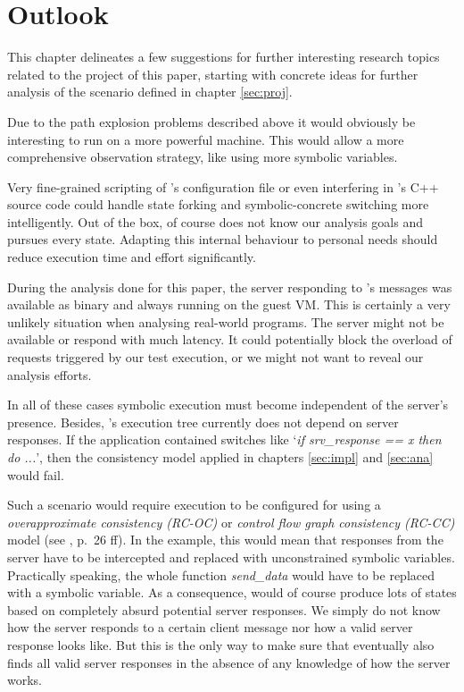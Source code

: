 \section{Outlook}\label{sec:outlook}

This chapter delineates a few suggestions for further interesting research topics related to the project of this paper, starting with concrete ideas for further analysis of the scenario defined in chapter \ref{sec:proj}.

\medskip
Due to the path explosion problems described above it would obviously be interesting to run \sse on a more powerful machine.
This would allow a more comprehensive observation strategy, like using more symbolic variables.

\medskip
Very fine-grained scripting of \sse's configuration file or even interfering in \sse's C++ source code could handle state forking and symbolic-concrete switching more intelligently.
Out of the box, \sse of course does not know our analysis goals and pursues every state.
Adapting this internal behaviour to personal needs should reduce execution time and effort significantly.

\medskip
During the analysis done for this paper, the server responding to \app's messages was available as binary and always running on the guest VM.
This is certainly a very unlikely situation when analysing real-world programs.
The server might not be available or respond with much latency.
It could potentially block the overload of requests triggered by our test execution, or we might not want to reveal our analysis efforts.

In all of these cases symbolic execution must become independent of the server's presence.
Besides, \app's execution tree currently does not depend on server responses.
If the application contained switches like `\textit{if srv\_response == x then do ...}', then the consistency model applied in chapters \ref{sec:impl} and \ref{sec:ana} would fail.

Such a scenario would require \sse execution to be configured for using a \textit{overapproximate consistency (RC-OC)} or \textit{control flow graph consistency (RC-CC)} model (see \cite{chip14s2e}, p.~26 ff).
In the \app example, this would mean that responses from the server have to be intercepted and replaced with unconstrained symbolic variables.
Practically speaking, the whole function \textit{send\_data} would have to be replaced with a symbolic variable.
As a consequence, \sse would of course produce lots of states based on completely absurd potential server responses.
We simply do not know how the server responds to a certain client message nor how a valid server response looks like.
But this is the only way to make sure that \sse eventually also finds all valid server responses in the absence of any knowledge of how the server works. 


